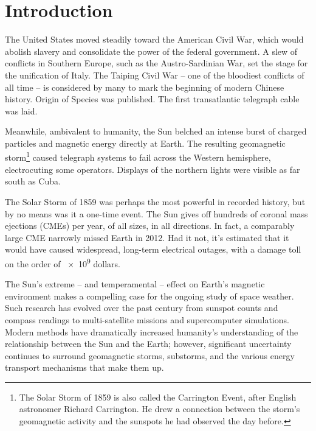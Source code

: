 
\chapter{Introduction}
  \label{ch_intro}

 The United States moved steadily toward the American Civil War, which would abolish slavery and consolidate the power of the federal government. A slew of conflicts in Southern Europe, such as the Austro-Sardinian War, set the stage for the unification of Italy. The Taiping Civil War -- one of the bloodiest conflicts of all time -- is considered by many to mark the beginning of modern Chinese history. Origin of Species was published. The first transatlantic telegraph cable was laid.

Meanwhile, ambivalent to humanity, the Sun belched an intense burst of charged particles and magnetic energy directly at Earth. The resulting geomagnetic storm\footnote{The Solar Storm of 1859 is also called the Carrington Event, after English astronomer Richard Carrington. He drew a connection between the storm's geomagnetic activity and the sunspots he had observed the day before.} caused telegraph systems to fail across the Western hemisphere\cite{green_2006}, electrocuting some operators. Displays of the northern lights were visible as far south as Cuba. 

The Solar Storm of 1859 was perhaps the most powerful in recorded history, but by no means was it a one-time event. The Sun gives off hundreds of coronal mass ejections (CMEs) per year, of all sizes, in all directions. In fact, a comparably large CME narrowly missed Earth in 2012\cite{nasa_2012}. Had it not, it's estimated\cite{lloyds_2013} that it would have caused widespread, long-term electrical outages, with a damage toll on the order of \num{e9} dollars. 

The Sun's extreme -- and temperamental -- effect on Earth's magnetic environment makes a compelling case for the ongoing study of space weather. Such research has evolved over the past century from sunspot counts and compass readings to multi-satellite missions and supercomputer simulations. Modern methods have dramatically increased humanity's understanding of the relationship between the Sun and the Earth; however, significant uncertainty continues to surround geomagnetic storms, substorms, and the various energy transport mechanisms that make them up. 

